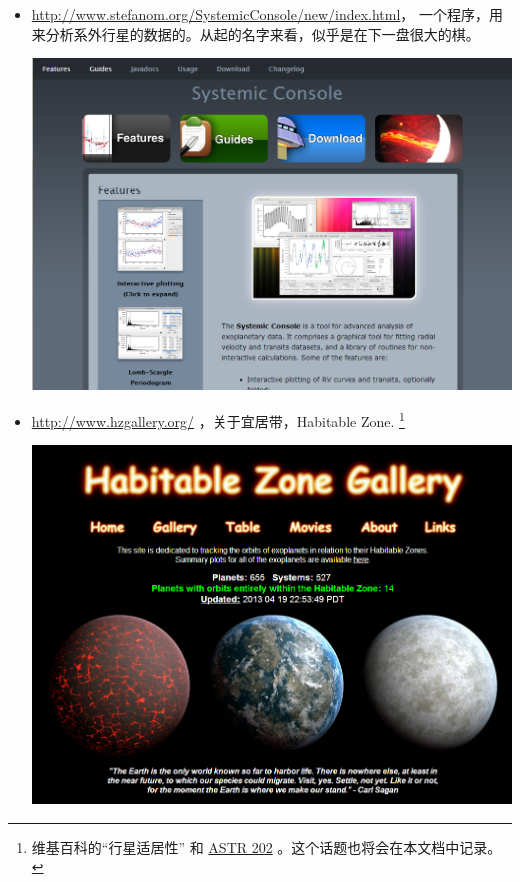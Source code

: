 \documentclass[letterpaper,10pt,english]{sphinxmanual}
\begin{document}
\begin{itemize}
\item {} 
\href{http://www.stefanom.org/SystemicConsole/new/index.html}{http://www.stefanom.org/SystemicConsole/new/index.html}， 一个程序，用来分析系外行星的数据的。从起的名字来看，似乎是在下一盘很大的棋。

\includegraphics{Systemic.png}

\item {} 
\href{http://www.hzgallery.org/}{http://www.hzgallery.org/} ，关于宜居带，Habitable Zone. \footnote{
维基百科的“行星适居性” 和 \href{http://exoplanet.as.arizona.edu/~lclose/teaching/a202/a202\_sched.html}{ASTR 202} 。这个话题也将会在本文档中记录。
}

\includegraphics{Habatiable.png}

\end{itemize}
\end{document}
